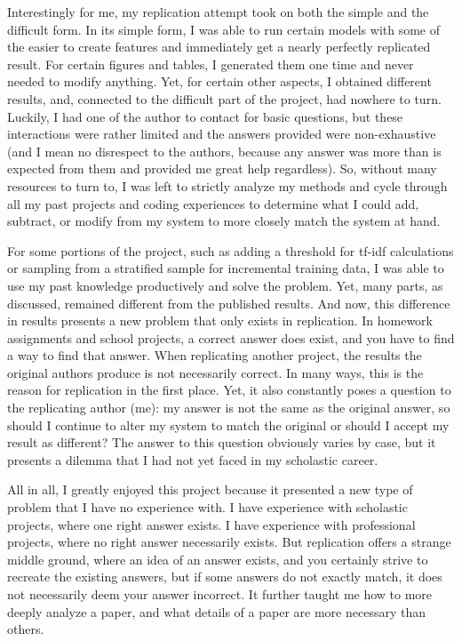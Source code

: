 \documentclass{article}
\begin{document}
Interestingly for me, my replication attempt took on both the simple and the difficult form. In its simple form, I was able to run certain models with some of the easier to create features and immediately get a nearly perfectly replicated result. For certain figures and tables, I generated them one time and never needed to modify anything. Yet, for certain other aspects, I obtained different results, and, connected to the difficult part of the project, had nowhere to turn. Luckily, I had one of the author to contact for basic questions, but these interactions were rather limited and the answers provided were non-exhaustive (and I mean no disrespect to the authors, because any answer was more than is expected from them and provided me great help regardless). So, without many resources to turn to, I was left to strictly analyze my methods and cycle through all my past projects and coding experiences to determine what I could add, subtract, or modify from my system to more closely match the system at hand. 

For some portions of the project, such as adding a threshold for tf-idf calculations or sampling from a stratified sample for incremental training data, I was able to use my past knowledge productively and solve the problem. Yet, many parts, as discussed, remained different from the published results. And now, this difference in results presents a new problem that only exists in replication. In homework assignments and school projects, a correct answer does exist, and you have to find a way to find that answer. When replicating another project, the results the original authors produce is not necessarily correct. In many ways, this is the reason for replication in the first place. Yet, it also constantly poses a question to the replicating author (me): my answer is not the same as the original answer, so should I continue to alter my system to match the original or should I accept my result as different? The answer to this question obviously varies by case, but it presents a dilemma that I had not yet faced in my scholastic career.

All in all, I greatly enjoyed this project because it presented a new type of problem that I have no experience with. I have experience with scholastic projects, where one right answer exists. I have experience with professional projects, where no right answer necessarily exists. But replication offers a strange middle ground, where an idea of an answer exists, and you certainly strive to recreate the existing answers, but if some answers do not exactly match, it does not necessarily deem your answer incorrect. It further taught me how to more deeply analyze a paper, and what details of a paper are more necessary than others.
\end{document}

